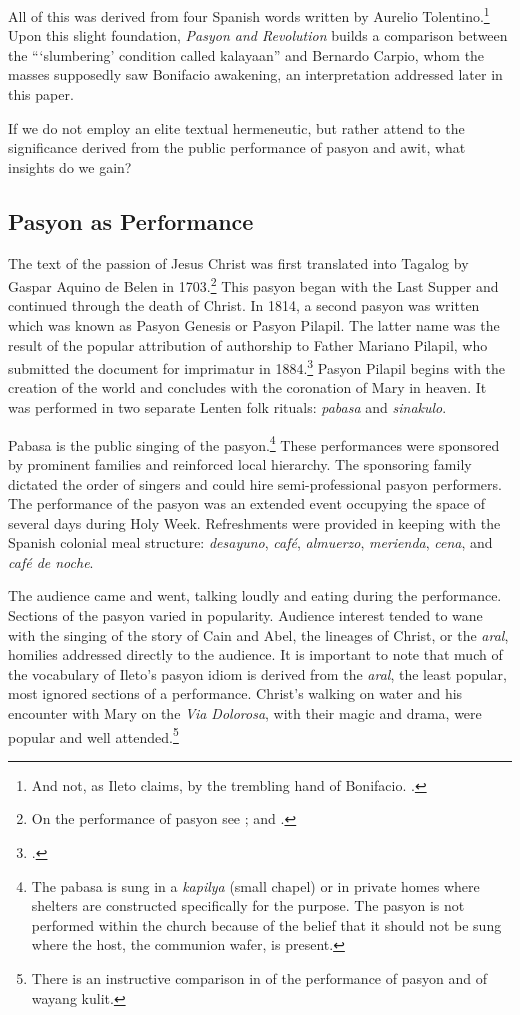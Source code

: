 All of this was derived from four Spanish words written by Aurelio Tolentino.\footnote{And not, as Ileto claims, by the trembling hand of Bonifacio. \parencite[225]{Kalaw1965}.} Upon this slight foundation, \textit{Pasyon and Revolution} builds a comparison between the \enquote{\enquote{slumbering} condition called kalayaan} and Bernardo Carpio, whom the masses supposedly saw Bonifacio awakening, an interpretation addressed later in this paper.

If we do not employ an elite textual hermeneutic, but rather attend to the significance derived from the public performance of pasyon and awit, what insights do we gain?

\subsection{Pasyon as Performance}

The text of the passion of Jesus Christ was first translated into Tagalog by Gaspar Aquino de Belen in 1703.\footnote{On the performance of pasyon see \cite{Trimillos1992}; and \cite{Tiongson1975}.} This pasyon began with the Last Supper and continued through the death of Christ. In 1814, a second pasyon was written which was known as Pasyon Genesis or Pasyon Pilapil. The latter name was the result of the popular attribution of authorship to Father Mariano Pilapil, who submitted the document for imprimatur in 1884.\footcite[8]{Trimillos1992} Pasyon Pilapil begins with the creation of the world and concludes with the coronation of Mary in heaven. It was performed in two separate Lenten folk rituals: \textit{pabasa} and \textit{sinakulo}.

Pabasa is the public singing of the pasyon.\footnote{The pabasa is sung in a \textit{kapilya} (small chapel) or in private homes where shelters are constructed specifically for the purpose. The pasyon is not performed within the church because of the belief that it should not be sung where the host, the communion wafer, is present.} These performances were sponsored by prominent families and reinforced local hierarchy. The sponsoring family dictated the order of singers and could hire semi-professional pasyon performers. The performance of the pasyon was an extended event occupying the space of several days during Holy Week. Refreshments were provided in keeping with the Spanish colonial meal structure: \textit{desayuno}, \textit{caf\'e}, \textit{almuerzo}, \textit{merienda}, \textit{cena}, and \textit{caf\'e de noche}.

The audience came and went, talking loudly and eating during the performance. Sections of the pasyon varied in popularity. Audience interest tended to wane with the singing of the story of Cain and Abel, the lineages of Christ, or the \textit{aral}, homilies addressed directly to the audience. It is important to note that much of the vocabulary of Ileto's pasyon idiom is derived from the \textit{aral}, the least popular, most ignored sections of a performance. Christ's walking on water and his encounter with Mary on the \textit{Via Dolorosa}, with their magic and drama, were popular and well attended.\footnote{There is an instructive comparison in \cite{Trimillos1992} of the performance of pasyon and of wayang kulit.} 

